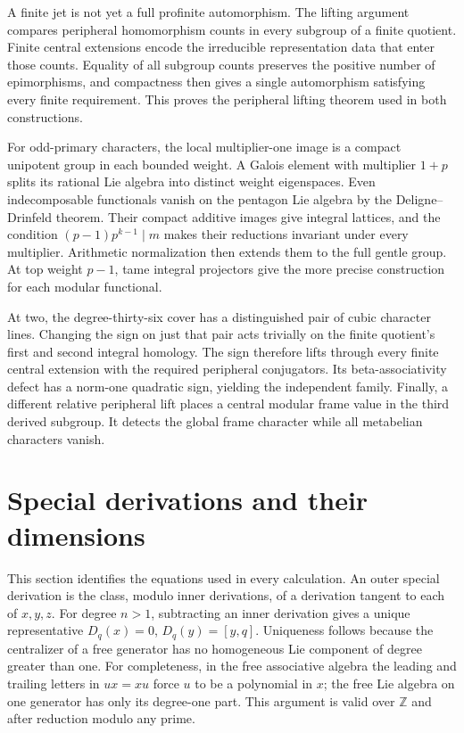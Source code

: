 \documentclass[11pt]{article}
\newcommand{\Z}{\mathbb Z}
\theoremstyle{definition}
\theoremstyle{remark}
\begin{document}
A finite jet is not yet a full profinite automorphism. The lifting
argument compares peripheral homomorphism counts in every subgroup of
a finite quotient. Finite central extensions encode the irreducible
representation data that enter those counts. Equality of all subgroup
counts preserves the positive number of epimorphisms, and compactness
then gives a single automorphism satisfying every finite requirement.
This proves the peripheral lifting theorem used in both constructions.

For odd-primary characters, the local multiplier-one image is a compact
unipotent group in each bounded weight. A Galois element with multiplier
$1+p$ splits its rational Lie algebra into distinct weight eigenspaces.
Even indecomposable functionals vanish on the pentagon Lie algebra by
the Deligne--Drinfeld theorem. Their compact additive images give integral
lattices, and the condition $(p-1)p^{k-1}\mid m$ makes their reductions
invariant under every multiplier. Arithmetic normalization then extends
them to the full gentle group. At top weight $p-1$, tame integral
projectors give the more precise construction for each modular functional.

At two, the degree-thirty-six cover has a distinguished pair of cubic
character lines. Changing the sign on just that pair acts trivially
on the finite quotient's first and second integral homology. The sign
therefore lifts through every finite central extension with the required
peripheral conjugators. Its beta-associativity defect has a norm-one
quadratic sign, yielding the independent family. Finally, a different
relative peripheral lift places a central modular frame value in the
third derived subgroup. It detects the global frame character while
all metabelian characters vanish.

\section{Special derivations and their dimensions}\label{sec:dimensions}
This section identifies the equations used in every calculation.
An outer special derivation is the class, modulo inner derivations, of a
derivation tangent to each of $x,y,z$.  For degree $n>1$, subtracting an
inner derivation gives a unique representative $D_q(x)=0$,
$D_q(y)=[y,q]$.  Uniqueness follows because the centralizer of a free
generator has no homogeneous Lie component of degree greater than one.
For completeness, in the free associative algebra the leading and trailing
letters in $ux=xu$ force $u$ to be a polynomial in $x$; the free Lie algebra
on one generator has only its degree-one part.  This argument is valid
over $\Z$ and after reduction modulo any prime.
\end{document}
